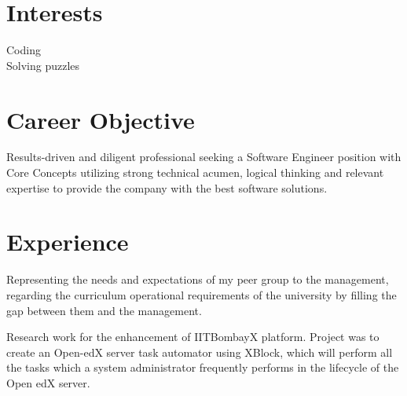 \documentclass[]{deedy-resume-openfont}
\begin{document}
\begin{minipage}[t]{0.33\textwidth}

\section{Interests}
Coding\\
Solving puzzles\\

\sectionsep

%
%

\end{minipage} 
\hfill
\begin{minipage}[t]{0.66\textwidth} 

\section{Career Objective}
Results-driven and diligent professional seeking a Software Engineer position with Core Concepts utilizing strong technical acumen, logical thinking and relevant expertise to provide the company with the best software solutions.
\sectionsep


\section{Experience}
\RaggedRight
{}
{\justifying \noindent Representing the needs and expectations of my peer group to the management, regarding the curriculum operational requirements of the university by filling the gap between them and the management. \par}

\sectionsep

{\justifying \noindent Research work for the enhancement of IITBombayX platform. Project was to create an Open-edX server task automator using XBlock, which will perform all the tasks which a system administrator frequently performs in the lifecycle of the Open edX server.\par}
\sectionsep



\end{minipage}
\end{document}
